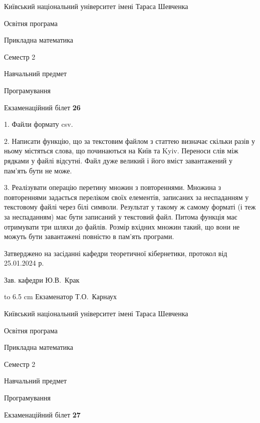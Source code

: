 \documentclass[12pt, ukrainian]{article}
\begin{document}
{{\begin {scriptsize}\par
{ \center  Київський національний університет імені Тараса Шевченка \par}
{\parbox {5 cm}{Освітня програма \hfill}{\parbox {7 cm}{Прикладна математика\hfill}}\parbox {6 cm}{\hfill Семестр 2}}\par
{\parbox {5 cm} {Навчальний предмет \hfill}\parbox {7 cm}{Програмування \hfill}\parbox {6cm}{\hfill}\par}\vspace{-15pt} \end{scriptsize}}{\center Екзаменаційний білет \No \textbf { 26 }\par}}
{%
1. Файли формату csv.%
\par
2. Написати функцію, що за текстовим файлом з статтею визначає скільки разів у ньому містяться слова, що починаються на Київ та Kyiv.  Переноси слів між рядками у файлі відсутні. Файл дуже великий і його вміст завантажений у пам'ять бути не може.

\par
3. Реалізувати операцію перетину множин з повтореннями. Множина з повтореннями задається переліком своїх елементів, записаних за неспаданням у текстовому файлі через білі символи. Результат у такому ж самому форматі (і теж за неспаданням) має бути записаний у текстовий файл. Питома функція має отримувати три шляхи до файлів. Розмір вхідних множин такий, що вони не можуть бути завантажені повністю в пам’ять програми.

}
{\smallskip\smallskip \begin {scriptsize} Затверджено на засіданні кафедри теоретичної кібернетики, протокол   від   25.01.2024 р.\par\smallskip\smallskip\smallskip\smallskip
{\parbox {6.5 cm} {Зав. кафедри \dotfill Ю.В.~Крак}}\hspace {0.7cm} {\hbox to 6.5 cm { Екзаменатор \dotfill Т.О.~Карнаух}} \end{scriptsize}}
\vspace{0.9cm}
{{\begin {scriptsize}\par
{ \center  Київський національний університет імені Тараса Шевченка \par}
{\parbox {5 cm}{Освітня програма \hfill}{\parbox {7 cm}{Прикладна математика\hfill}}\parbox {6 cm}{\hfill Семестр 2}}\par
{\parbox {5 cm} {Навчальний предмет \hfill}\parbox {7 cm}{Програмування \hfill}\parbox {6cm}{\hfill}\par}\vspace{-15pt} \end{scriptsize}}{\center Екзаменаційний білет \No \textbf { 27 }\par}}
\end{document}
